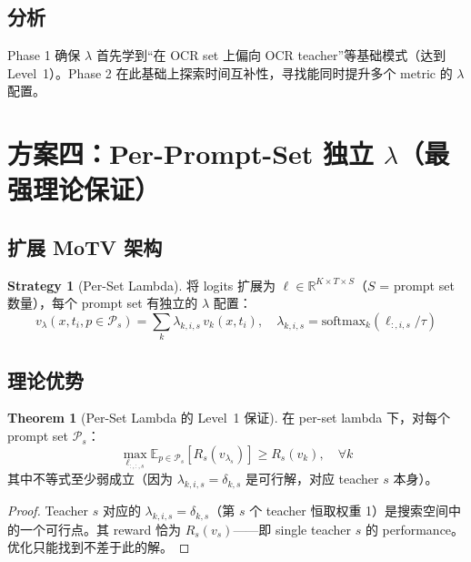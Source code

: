 \documentclass[11pt,a4paper]{article}
\newcommand{\E}{\mathbb{E}}
\newcommand{\R}{\mathbb{R}}
\newcommand{\softmax}{\mathrm{softmax}}
\theoremstyle{definition}
\newtheorem{theorem}{Theorem}
\newtheorem{strategy}{Strategy}
\begin{document}
\subsection{分析}

Phase 1 确保 $\lambda$ 首先学到``在 OCR set 上偏向 OCR teacher''等基础模式（达到 Level~1）。Phase 2 在此基础上探索时间互补性，寻找能同时提升多个 metric 的 $\lambda$ 配置。

\section{方案四：Per-Prompt-Set 独立 $\lambda$（最强理论保证）}
\label{sec:per_set_lambda}

\subsection{扩展 MoTV 架构}

\begin{strategy}[Per-Set Lambda]
\label{strat:per_set}
将 logits 扩展为 $\ell \in \R^{K \times T \times S}$（$S$ = prompt set 数量），每个 prompt set 有独立的 $\lambda$ 配置：
\begin{equation}
v_\lambda(x, t_i, p \in \mathcal{P}_s) = \sum_k \lambda_{k,i,s}\, v_k(x, t_i), \quad
\lambda_{k,i,s} = \softmax_k(\ell_{:,i,s} / \tau)
\end{equation}
\end{strategy}

\subsection{理论优势}

\begin{theorem}[Per-Set Lambda 的 Level~1 保证]
\label{thm:per_set_level1}
在 per-set lambda 下，对每个 prompt set $\mathcal{P}_s$：
\begin{equation}
\max_{\ell_{:,:,s}} \E_{p \in \mathcal{P}_s}\left[R_s(v_{\lambda_s})\right] \geq R_s(v_k), \quad \forall k
\end{equation}
其中不等式至少弱成立（因为 $\lambda_{k,i,s} = \delta_{k,s}$ 是可行解，对应 teacher $s$ 本身）。
\end{theorem}

\begin{proof}
Teacher $s$ 对应的 $\lambda_{k,i,s} = \delta_{k,s}$（第 $s$ 个 teacher 恒取权重 1）是搜索空间中的一个可行点。其 reward 恰为 $R_s(v_s)$——即 single teacher $s$ 的 performance。优化只能找到不差于此的解。
\end{proof}
\end{document}
